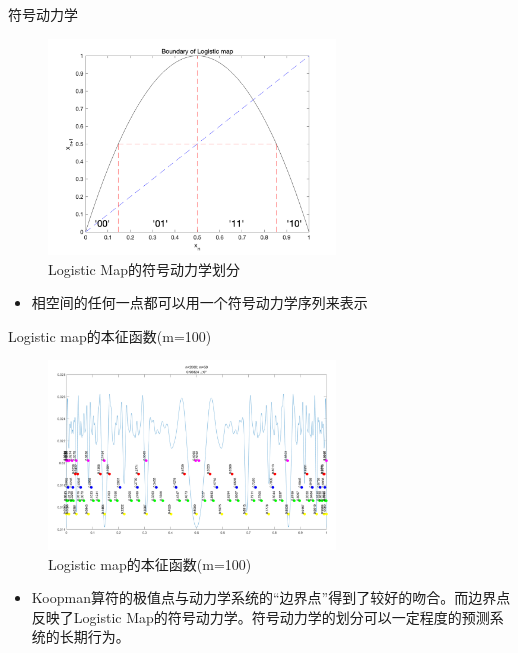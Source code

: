 \documentclass{beamer}
\begin{document}
\begin{frame}{符号动力学}
	\begin{figure}
		\centering
		\includegraphics[width=3in]{figure/logistic_symbolic}
		\caption{Logistic Map的符号动力学划分}
	\end{figure}
	\begin{itemize}
		\item 相空间的任何一点都可以用一个符号动力学序列来表示
	\end{itemize}
\end{frame}

\begin{frame}{Logistic map的本征函数(m=100)}
	\begin{figure}
		\centering
		\includegraphics[width=3in]{figure/logistic_eigen_m100}
		\caption{Logistic map的本征函数(m=100)}
	\end{figure}
	\begin{itemize}
		\item Koopman算符的极值点与动力学系统的“边界点”得到了较好的吻合。而边界点反映了Logistic Map的符号动力学。符号动力学的划分可以一定程度的预测系统的长期行为。
	\end{itemize}
\end{frame}
\end{document}
